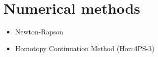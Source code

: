 \section{Numerical methods}

\begin{itemize}
	\item{Newton-Rapson}
	\item{Homotopy Continuation Method (Hom4PS-3)}
\end{itemize}


